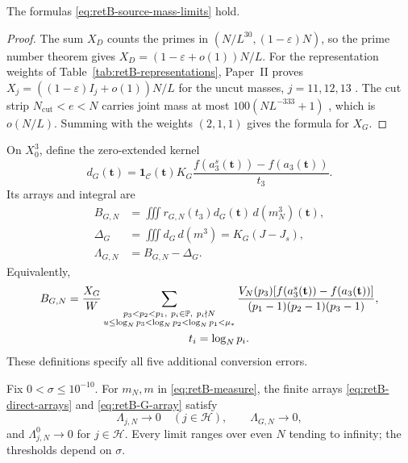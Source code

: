 \begin{lemma}\label{lem:retB-source-mass}
The formulas \eqref{eq:retB-source-mass-limits} hold.
\end{lemma}
\begin{proof}
The sum $X_D$ counts the primes in $(N/L^{30},(1-\varepsilon)N)$, so the
prime number theorem gives $X_D=(1-\varepsilon+o(1))N/L$.
For the representation weights of Table~\ref{tab:retB-representations},
Paper~II proves $X_j=((1-\varepsilon)I_j+o(1))N/L$ for the uncut masses,
$j=11,12,13$ \cite[(4.76)--(4.77)]{PaperII}. The cut strip
$N_{\mathrm{cut}}<e<N$ carries joint mass at most $100(NL^{-333}+1)$
\cite[(4.16)--(4.17)]{PaperII}, which is $o(N/L)$. Summing with the
weights $(2,1,1)$ gives the formula for $X_G$.
\end{proof}

On $X_0^3$, define the zero-extended kernel
\begin{equation}\label{eq:retB-G-gain-kernel}
 d_G(\mathbf t)=\mathbf1_{\mathcal C}(\mathbf t)
       K_G\frac{f(a_3^s(\mathbf t))-f(a_3(\mathbf t))}{t_3}.
\end{equation}
Its arrays and integral are
\begin{equation}\label{eq:retB-G-array}
\begin{aligned}
 B_{G,N}&=\iiint r_{G,N}(t_3)d_G(\mathbf t)\,d(m_N^3)(\mathbf t),\\
 \Delta_G&=\iiint d_G\,d(m^3)=K_G(J-J_s),\\
 \Lambda_{G,N}&=B_{G,N}-\Delta_G.
\end{aligned}
\end{equation}
Equivalently,
\begin{equation}\label{eq:retB-G-prime-sum}
\begin{aligned}
 B_{G,N}&=\frac{X_G}{W}
 \sum_{\substack{p_3<p_2<p_1,\ p_i\in\mathbb P,\ p_i\nmid N\\
           u\le\log_Np_3<\log_Np_2<\log_Np_1<\mu_*}}
 \frac{V_N(p_3)[f(a_3^s(\mathbf t))-f(a_3(\mathbf t))]}
      {(p_1-1)(p_2-1)(p_3-1)},\\
 &\hspace{38mm}t_i=\log_Np_i.
\end{aligned}
\end{equation}
These definitions specify all five additional conversion errors.

\begin{lemma}
\label{lem:retB-conversion}
Fix $0<\sigma\le10^{-10}$. For $m_N,m$ in \eqref{eq:retB-measure}, the finite
arrays \eqref{eq:retB-direct-arrays} and \eqref{eq:retB-G-array} satisfy
\begin{equation}\label{eq:retB-conversion-limit}
 \Lambda_{j,N}\longrightarrow0\quad(j\in\mathcal H),\qquad
 \Lambda_{G,N}\longrightarrow0,
\end{equation}
and $\Lambda^0_{j,N}\to0$ for $j\in\mathcal H$.
Every limit ranges over even $N$ tending to infinity; the thresholds depend
on $\sigma$.
\end{lemma}

